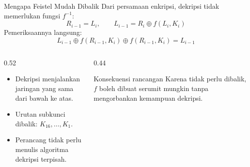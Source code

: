 \documentclass[aspectratio=169,11pt]{beamer}
\begin{document}
\begin{frame}{Mengapa Feistel Mudah Dibalik}
    \footnotesize
    Dari persamaan enkripsi, dekripsi tidak memerlukan fungsi $f^{-1}$:
    \[
        R_{i-1} = L_i, \qquad
        L_{i-1} = R_i \oplus f(L_i,K_i)
    \]
    Pemeriksaannya langsung:
    \[
        L_{i-1}\oplus f(R_{i-1},K_i)\oplus f(R_{i-1},K_i)
        = L_{i-1}
    \]
    \begin{columns}[T,onlytextwidth]
        \begin{column}{0.52\textwidth}
            \begin{itemize}
                \item Dekripsi menjalankan jaringan yang sama dari bawah
                      ke atas.
                \item Urutan subkunci dibalik: $K_{16},\dots,K_1$.
                \item Perancang tidak perlu menulis algoritma dekripsi
                      terpisah.
            \end{itemize}
        \end{column}
        \begin{column}{0.44\textwidth}
            \begin{exampleblock}{Konsekuensi rancangan}
                \footnotesize
                Karena tidak perlu dibalik, $f$ boleh dibuat serumit
                mungkin tanpa mengorbankan kemampuan dekripsi.
            \end{exampleblock}
        \end{column}
    \end{columns}
\end{frame}
\end{document}
